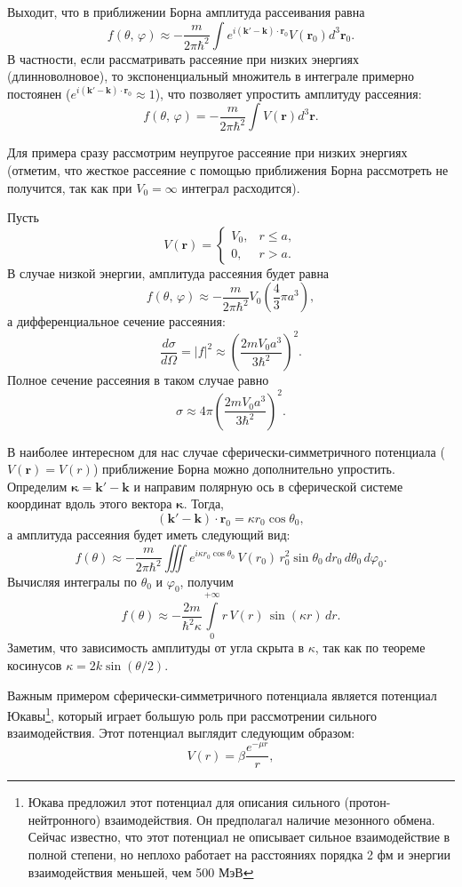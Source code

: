 Выходит, что в приближении Борна амплитуда рассеивания равна
\[
  f(\theta,\,\varphi)\approx-\frac{m}{2\pi\hbar^2}\int e^{i(\textbf{k}'-\textbf{k})\cdot\textbf{r}_0}V(\textbf{r}_0)d^3\textbf{r}_0.
\]
В частности, если рассматривать рассеяние при низких энергиях (длинноволновое),
то экспоненциальный множитель в интеграле примерно постоянен
($e^{i(\textbf{k}'-\textbf{k})\cdot\textbf{r}_0}\approx 1$), что позволяет
упростить амплитуду рассеяния:
\[
  f(\theta, \, \varphi)=-\frac{m}{2\pi\hbar^2}\int V(\textbf{r})d^3\textbf{r}.
\]

Для примера сразу рассмотрим неупругое рассеяние при низких энергиях (отметим,
что жесткое рассеяние с помощью приближения Борна рассмотреть не получится, так
как при $V_0=\infty$ интеграл расходится).

\exercisebadge
Пусть
\[
  V(\textbf{r})=\begin{cases}
    V_0, &r\leq a, \\ 0, &r>a.
  \end{cases}
\]
В случае низкой энергии, амплитуда рассеяния будет равна
\[
  f(\theta, \, \varphi)\approx-\frac{m}{2\pi\hbar^2}V_0\left(\frac{4}{3}\pi a^3\right),
\]
а дифференциальное сечение рассеяния:
\[
  \frac{d\sigma}{d\Omega}=|f|^2\approx\left(\frac{2mV_0 a^3}{3\hbar^2}\right)^2.
\]
Полное сечение рассеяния в таком случае равно
\[
  \sigma\approx4\pi\left(\frac{2mV_0 a^3}{3\hbar^2}\right)^2.
\]
\qedsq

В наиболее интересном для нас случае сферически-симметричного потенциала
($V(\textbf{r})=V(r)$) приближение Борна можно дополнительно упростить.
Определим $\boldsymbol{\kappa}=\textbf{k}'-\textbf{k}$ и направим полярную ось
в сферической системе координат вдоль этого вектора $\boldsymbol{\kappa}$.
Тогда,
\[
  (\textbf{k}'-\textbf{k})\cdot\textbf{r}_0=\kappa r_0\cos\theta_0,
\]
а амплитуда рассеяния будет иметь следующий вид:
\[
  f(\theta)\approx-\frac{m}{2\pi\hbar^2}\iiint e^{i\kappa r_0\cos\theta_0}\,V(r_0)\,r_0^2\sin\theta_0\,dr_0\,d\theta_0\,d\varphi_0.
\]
Вычисляя интегралы по $\theta_0$ и $\varphi_0$, получим
\[
  f(\theta)\approx-\frac{2m}{\hbar^2\kappa}\int\limits_0^{+\infty}r\,V(r)\,\sin(\kappa r)\,dr.
\]
Заметим, что зависимость амплитуды от угла скрыта в $\kappa$, так как по
теореме косинусов $\kappa = 2k\sin(\theta/2)$.

Важным примером сферически-симметричного потенциала является потенциал
Юкавы\footnote{Юкава предложил этот потенциал для описания сильного
  (протон-нейтронного) взаимодействия. Он предполагал наличие мезонного обмена.
  Сейчас известно, что этот потенциал не описывает сильное взаимодействие в
  полной степени, но неплохо работает на расстояниях порядка 2 фм и энергии
  взаимодействия меньшей, чем 500 МэВ}, который играет большую роль при
рассмотрении сильного взаимодействия. Этот потенциал выглядит следующим
образом:
\[
  V(r)=\beta\frac{e^{-\mu r}}{r},
\]


